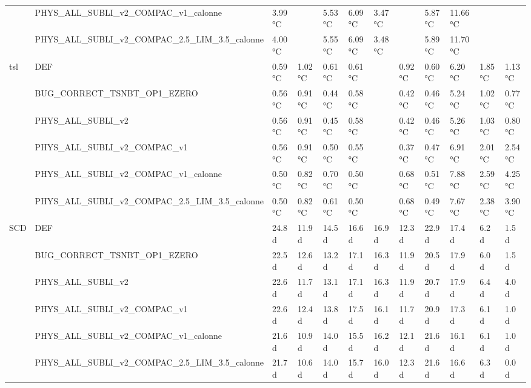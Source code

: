 \begin{tabular}{llllllllllll}
 & PHYS_ALL_SUBLI_v2_COMPAC_v1_calonne & 3.99 °C &  & 5.53 °C & 6.09 °C & 3.47 °C &  & 5.87 °C & 11.66 °C &  &  \\
 & PHYS_ALL_SUBLI_v2_COMPAC_2.5_LIM_3.5_calonne & 4.00 °C &  & 5.55 °C & 6.09 °C & 3.48 °C &  & 5.89 °C & 11.70 °C &  &  \\
\cline{1-12}
\multirow[t]{6}{*}{tsl} & DEF & 0.59 °C & 1.02 °C & 0.61 °C & 0.61 °C &  & 0.92 °C & 0.60 °C & 6.20 °C & 1.85 °C & 1.13 °C \\
 & BUG_CORRECT_TSNBT_OP1_EZERO & 0.56 °C & 0.91 °C & 0.44 °C & 0.58 °C &  & 0.42 °C & 0.46 °C & 5.24 °C & 1.02 °C & 0.77 °C \\
 & PHYS_ALL_SUBLI_v2 & 0.56 °C & 0.91 °C & 0.45 °C & 0.58 °C &  & 0.42 °C & 0.46 °C & 5.26 °C & 1.03 °C & 0.80 °C \\
 & PHYS_ALL_SUBLI_v2_COMPAC_v1 & 0.56 °C & 0.91 °C & 0.50 °C & 0.55 °C &  & 0.37 °C & 0.47 °C & 6.91 °C & 2.01 °C & 2.54 °C \\
 & PHYS_ALL_SUBLI_v2_COMPAC_v1_calonne & 0.50 °C & 0.82 °C & 0.70 °C & 0.50 °C &  & 0.68 °C & 0.51 °C & 7.88 °C & 2.59 °C & 4.25 °C \\
 & PHYS_ALL_SUBLI_v2_COMPAC_2.5_LIM_3.5_calonne & 0.50 °C & 0.82 °C & 0.61 °C & 0.50 °C &  & 0.68 °C & 0.49 °C & 7.67 °C & 2.38 °C & 3.90 °C \\
\cline{1-12}
\multirow[t]{6}{*}{SCD} & DEF & 24.8 d & 11.9 d & 14.5 d & 16.6 d & 16.9 d & 12.3 d & 22.9 d & 17.4 d & 6.2 d & 1.5 d \\
 & BUG_CORRECT_TSNBT_OP1_EZERO & 22.5 d & 12.6 d & 13.2 d & 17.1 d & 16.3 d & 11.9 d & 20.5 d & 17.9 d & 6.0 d & 1.5 d \\
 & PHYS_ALL_SUBLI_v2 & 22.6 d & 11.7 d & 13.1 d & 17.1 d & 16.3 d & 11.9 d & 20.7 d & 17.9 d & 6.4 d & 4.0 d \\
 & PHYS_ALL_SUBLI_v2_COMPAC_v1 & 22.6 d & 12.4 d & 13.8 d & 17.5 d & 16.1 d & 11.7 d & 20.9 d & 17.3 d & 6.1 d & 1.0 d \\
 & PHYS_ALL_SUBLI_v2_COMPAC_v1_calonne & 21.6 d & 10.9 d & 14.0 d & 15.5 d & 16.2 d & 12.1 d & 21.6 d & 16.1 d & 6.1 d & 1.0 d \\
 & PHYS_ALL_SUBLI_v2_COMPAC_2.5_LIM_3.5_calonne & 21.7 d & 10.6 d & 14.0 d & 15.7 d & 16.0 d & 12.3 d & 21.6 d & 16.6 d & 6.3 d & 0.0 d \\
\cline{1-12}
\bottomrule
\end{tabular}
